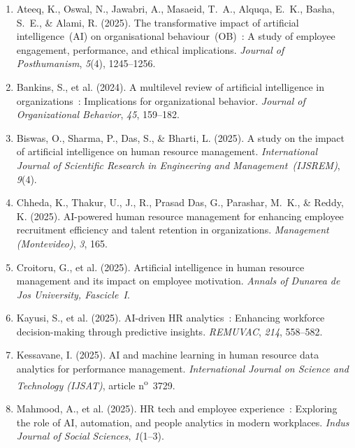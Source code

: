 \documentclass[12pt,a4paper]{article}
\begin{document}
\sloppy
\begin{enumerate}

\item Ateeq, K., Oswal, N., Jawabri, A., Masaeid, T.~A., Alquqa, E.~K., Basha, S.~E.,
  \& Alami, R. (2025). The transformative impact of artificial intelligence~(AI) on
  organisational behaviour~(OB)~: A study of employee engagement, performance, and
  ethical implications. \textit{Journal of Posthumanism}, \textit{5}(4), 1245--1256.

\item Bankins, S., et al. (2024). A multilevel review of artificial intelligence in
  organizations~: Implications for organizational behavior. \textit{Journal of
  Organizational Behavior}, \textit{45}, 159--182.

\item Biswas, O., Sharma, P., Das, S., \& Bharti, L. (2025). A study on the impact of
  artificial intelligence on human resource management. \textit{International Journal of
  Scientific Research in Engineering and Management~(IJSREM)}, \textit{9}(4).

\item Chheda, K., Thakur, U., J., R., Prasad Das, G., Parashar, M.~K., \& Reddy, K.
  (2025). AI-powered human resource management for enhancing employee recruitment
  efficiency and talent retention in organizations. \textit{Management (Montevideo)},
  \textit{3}, 165.

\item Croitoru, G., et al. (2025). Artificial intelligence in human resource management
  and its impact on employee motivation. \textit{Annals of Dunarea de Jos University,
  Fascicle~I}.

\item Kayusi, S., et al. (2025). AI-driven HR analytics~: Enhancing workforce
  decision-making through predictive insights. \textit{REMUVAC}, \textit{214},
  558--582.

\item Kessavane, I. (2025). AI and machine learning in human resource data analytics for
  performance management. \textit{International Journal on Science and Technology
  (IJSAT)}, article n\textsuperscript{o}~3729.

\item Mahmood, A., et al. (2025). HR tech and employee experience~: Exploring the role
  of AI, automation, and people analytics in modern workplaces. \textit{Indus Journal
  of Social Sciences}, \textit{1}(1--3).


\end{enumerate}
\end{document}
